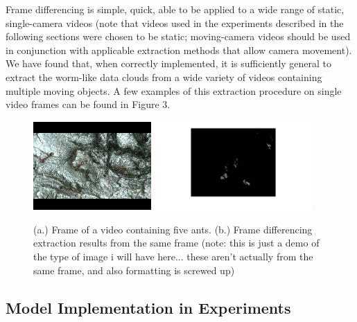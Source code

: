 \documentclass{article}
\begin{document}
Frame differencing is simple, quick, able to be applied to a wide range of static, single-camera videos (note that videos used in the experiments described in the following sections were chosen to be static; moving-camera videos should be used in conjunction with applicable extraction methods that allow camera movement). We have found that, when correctly implemented, it is sufficiently general to extract the worm-like data clouds from a wide variety of videos containing multiple moving objects. A few examples of this extraction procedure on single video frames can be found in Figure 3.

\begin{figure}
\centering
{\includegraphics[width=45mm]{antpic2.png}}
{\includegraphics[width=60mm]{frame_diff_ants_1.png}}
\caption{(a.) Frame of a video containing five ants. (b.) Frame differencing extraction results from the same frame (note: this is just a demo of the type of image i will have here... these aren't actually from the same frame, and also formatting is screwed up)}
\label{test}
\end{figure}



\subsection{Model Implementation in Experiments}
%
\end{document}
